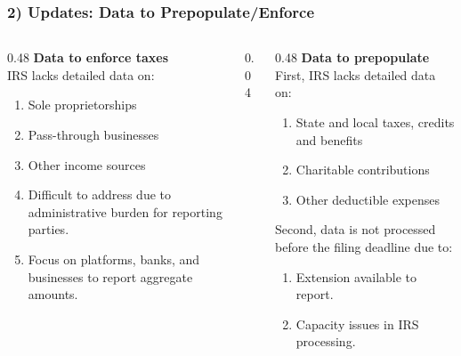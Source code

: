 \documentclass{beamer}
\begin{document}
\begin{frame}
\frametitle{2) Updates: Data to Prepopulate/Enforce}

\begin{columns}[T,onlytextwidth]

\begin{column}{0.48\textwidth}
\textbf{Data to enforce taxes} \\[0.5em]
IRS lacks detailed data on:
\begin{enumerate}
    \item Sole proprietorships
    \item Pass-through businesses\footnotemark[1]
    \item Other income sources\footnotemark[2]
    \vspace{1em}
    \item[$\rightarrow$] Difficult to address due to administrative burden for reporting parties.
    \item[$\rightarrow$] Focus on platforms, banks, and businesses to report aggregate amounts.
\end{enumerate}
\end{column}
\begin{column}{0.04\textwidth}
\end{column}
\begin{column}{0.48\textwidth}
\textbf{Data to prepopulate} \\[0.5em]
First, IRS lacks detailed data on:
\begin{enumerate}
    \item State and local taxes, credits and benefits
    \item Charitable contributions
    \item Other deductible expenses\footnotemark[3]
\end{enumerate}
\vspace{0.5em}
Second, data is not processed before the filing deadline due to: 
\begin{enumerate}
    \item Extension available to report.
    \item Capacity issues in IRS processing.
\end{enumerate}

\end{column}

\end{columns}


\end{frame}
\end{document}
